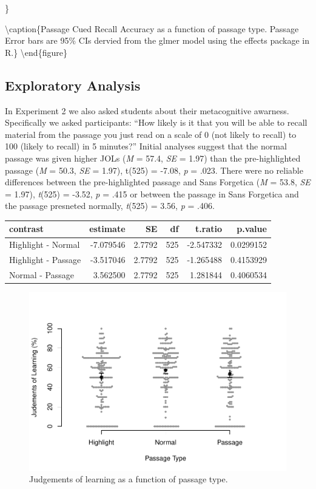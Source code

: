 \documentclass[english,doc]{apa6}
\begin{document}
\}

\textbackslash{}caption\{Passage Cued Recall Accuracy as a function of passage type. Passage Error bars are 95\% CIs dervied from the glmer model using the effects package in R.\}\label{fig:unnamed-chunk-3}
\textbackslash{}end\{figure\}

\hypertarget{exploratory-analysis}{%
\subsection{Exploratory Analysis}\label{exploratory-analysis}}

In Experiment 2 we also asked students about their metacognitive awarness. Specifically we asked participants: \enquote{How likely is it that you will be able to recall material from the passage you just read on a scale of 0 (not likely to recall) to 100 (likely to recall) in 5 minutes?} Initial analyses suggest that the normal passage was given higher JOLs (\emph{M} = 57.4, \emph{SE} = 1.97) than the pre-highlighted passage (\emph{M} = 50.3, \emph{SE} = 1.97), t(525) = -7.08, \emph{p} = .023. There were no reliable differences between the pre-highlighted passage and Sans Forgetica (\emph{M} = 53.8, \emph{SE} = 1.97), \emph{t}(525) = -3.52, \emph{p} = .415 or between the passage in Sans Forgetica and the passage presneted normally, \emph{t}(525) = 3.56, \emph{p} = .406.

\begin{tabular}{l|r|r|r|r|r}
\hline
contrast & estimate & SE & df & t.ratio & p.value\\
\hline
Highlight - Normal & -7.079546 & 2.7792 & 525 & -2.547332 & 0.0299152\\
\hline
Highlight - Passage & -3.517046 & 2.7792 & 525 & -1.265488 & 0.4153929\\
\hline
Normal - Passage & 3.562500 & 2.7792 & 525 & 1.281844 & 0.4060534\\
\hline
\end{tabular}

\begin{figure}

{\centering \includegraphics{SF_Paper_files/figure-latex/unnamed-chunk-4-1} 

}

\caption{Judgements of learning as a function of passage type.}\label{fig:unnamed-chunk-4}
\end{figure}
\end{document}

